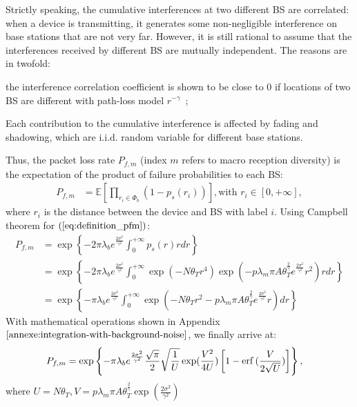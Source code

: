Strictly speaking, the cumulative interferences at two different BS are correlated: when a device is transmitting, it generates some non-negligible interference on base stations that are not very far. However, it is still rational to assume that the interferences received by different BS are mutually independent.
The reasons are in twofold:\begin{inparaenum}[1)]
	\item the interference correlation coefficient is shown to be close to $0$ if locations of two BS are different with path-loss model $r^{-\gamma}$~\cite[lemma 3.5]{haenggi2009interference}; 
	\item Each contribution to the cumulative interference is affected by fading and shadowing, which are i.i.d. random variable for different base stations.
\end{inparaenum}
Thus, the packet loss rate $P_{f,m}$ (index $m$ refers to macro reception diversity) is the expectation of the product of failure probabilities to each BS:
\begin{align}
\label{eq:definition_pfm}
P_{f,m} &= \mathbb{E}\left[  \prod_{r_i \in \Phi_{b}} (1-p_{s}(r_i)) \right], \text{with } r_i \in \left[0, +\infty\right],
\end{align} 
where $r_i$ is the distance between the device and BS with label $i$. Using Campbell theorem for  $(\ref{eq:definition_pfm})$:
\begin{align}
	\label{eq:bs_rx_divers_analytical_with_noise_before_last}
	P_{f,m} &= \exp\left\lbrace -2\pi \lambda_{b} e^{\frac{2\sigma^2}{\gamma^2}}  \int_{0}^{+\infty} p_{s}(r)rdr \right\rbrace \nonumber\\
	&= \exp \left\lbrace  -2\pi \lambda_{b} e^{\frac{2\sigma^2}{\gamma^2}}   \int_{0}^{+\infty}   \exp(-N \theta_{T} r^{4} ) \exp(-p \lambda_{m} \pi A \theta_{T}^{\frac{2}{\gamma}} e^{\frac{2\sigma^2}{\gamma^2}}  r^2 )    r dr   \right\rbrace \nonumber \\
	&= \exp \left\lbrace  -\pi \lambda_{b} e^{\frac{2\sigma^2}{\gamma^2}}  \int_{0}^{+\infty}   \exp(-N \theta_{T} r^{2} -p \lambda_{m} \pi A \theta_{T}^{\frac{2}{\gamma}} e^{\frac{2\sigma^2}{\gamma^2}}  r ) dr   \right\rbrace
\end{align} 
With mathematical operations shown in Appendix $\eqref{annexe:integration-with-background-noise}$, we finally arrive at:
\begin{align}
	\label{eq:bs_rx_divers_analytical_with_noise}
	P_{f,m}  &= \exp\left\lbrace -\pi \lambda_{b} e^{\frac{2\sigma^2}{\gamma^2}} \frac{\sqrt{\pi}}{2} \sqrt{\frac{1}{U}}\exp(\frac{V^2}{4U})\left[ 1 - \mathrm{erf}\,(\frac{V}{2\sqrt{U}})\right]  \right\rbrace    ,
\end{align} 
where $U=N \theta_{T}, V=p \lambda_{m} \pi A \theta_{T}^{\frac{2}{\gamma}} \exp( \frac{2\sigma^2}{\gamma^2})$

